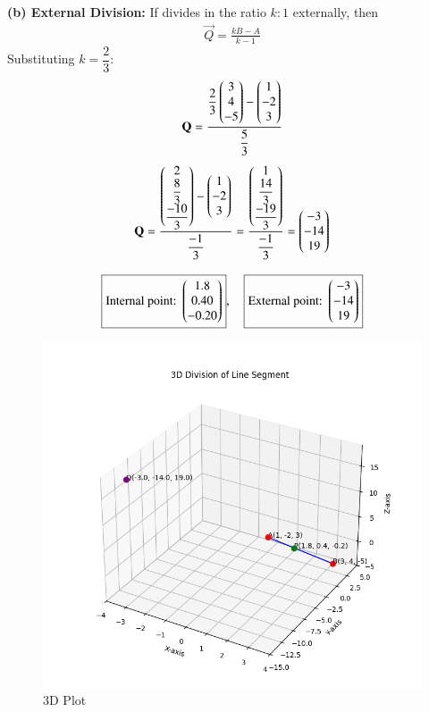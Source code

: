 \documentclass[12pt]{article}
\begin{document}
\textbf{(b) External Division:}  
If  divides  in the ratio $k:1$ externally, then
\begin{align}
\vec{Q} = \frac{kB-A}{k-1}
\end{align}
Substituting $k=\dfrac{2}{3}$:
\begin{align}
\mathbf{Q} = \frac{\dfrac{2}{3}\begin{pmatrix}3 \\ 4 \\ -5\end{pmatrix} - \begin{pmatrix}1 \\ -2 \\ 3\end{pmatrix}}{\dfrac{5}{3}}
\end{align}
\begin{align}
\mathbf{Q} = \frac{\begin{pmatrix}2 \\ \dfrac{8}{3} \\ \dfrac{-10}{3}\end{pmatrix} - \begin{pmatrix}1 \\ -2 \\ 3\end{pmatrix}}{\dfrac{-1}{3}}
= \frac{\begin{pmatrix}1 \\ \dfrac{14}{3} \\ \dfrac{-19}{3}\end{pmatrix}}{\dfrac{-1}{3}}
= \begin{pmatrix}-3 \\ -14 \\ 19\end{pmatrix}
\end{align}

\begin{align}
\boxed{\text{Internal point: } \begin{pmatrix}1.8 \\ 0.40 \\ -0.20\end{pmatrix}}, \quad
\boxed{\text{External point: } \begin{pmatrix}-3 \\ -14 \\ 19\end{pmatrix}}
\end{align}
\begin{figure}[H]
\centering
\includegraphics[width = 1.1\columnwidth]{figs/fig1.png}
\caption{3D Plot}
\label{fig1:plot}
\end{figure}
\end{document}
